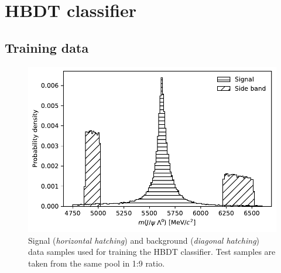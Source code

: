 \section{HBDT classifier}
\label{sec:HBDT}

\subsection{Training data}

\begin{figure}[t]
	\centering
	\includegraphics[width=.6\textwidth]{graphics/04-event_selection/sig_bkg_distribution_balance.pdf}
	\caption{Signal (\textit{horizontal hatching}) and background (\textit{diagonal hatching}) data samples used for training the HBDT classifier. Test samples are taken from the same pool in 1:9 ratio.}
	\label{fig:4:HBDT_training_data}
\end{figure}

